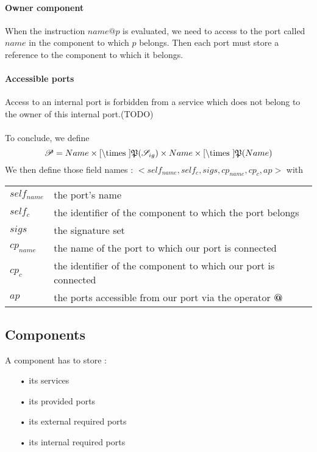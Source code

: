 \paragraph{Owner component}
When the instruction $name@p$ is evaluated, we need to access to the port called $name$ in the component to which $p$ belongs. Then each port must store a reference to the component to which it belongs.

\paragraph{Accessible ports}
Access to an internal port is forbidden from a service which does not belong to the owner of this internal port.(TODO)

\paragraph{}

To conclude, we define
\[\Po = Name \times \Cref \times \mathfrak{P}(\Sig)\times Name \times \Cref \times \mathfrak{P}(Name)\]
We then define those field names : $<self_{name}, self_c,sigs,cp_{name},cp_{c},ap>$ with

\begin{tabular}{ll}
$self_{name}$ & the port's name\\
$self_c$ & the identifier of the component to which the port belongs\\
$sigs$ & the signature set\\
$cp_{name}$ &  the name of the port to which our port is connected \\
$cp_c$ & the identifier of the component to which our port is connected \\
$ap$ & the ports accessible from our port via the operator \textbf{@}
\end{tabular}



\subsection{Components}
\label{component_value}
A component has to store :
\begin{itemize}
\item[•] its services
\item[•] its provided ports
\item[•] its external required ports
\item[•] its internal required ports
\end{itemize}

